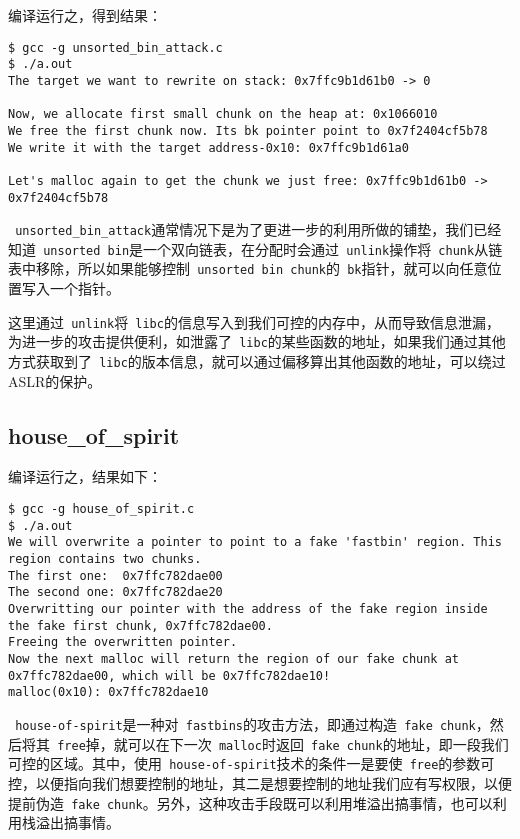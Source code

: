 编译运行之，得到结果：
\begin{verbatim}
$ gcc -g unsorted_bin_attack.c 
$ ./a.out 
The target we want to rewrite on stack: 0x7ffc9b1d61b0 -> 0

Now, we allocate first small chunk on the heap at: 0x1066010
We free the first chunk now. Its bk pointer point to 0x7f2404cf5b78
We write it with the target address-0x10: 0x7ffc9b1d61a0

Let's malloc again to get the chunk we just free: 0x7ffc9b1d61b0 -> 0x7f2404cf5b78
\end{verbatim}

\verb+ unsorted_bin_attack+通常情况下是为了更进一步的利用所做的铺垫，我们已经知道\verb+ unsorted bin+是一个双向链表，在分配时会通过\verb+ unlink+操作将\verb+ chunk+从链表中移除，所以如果能够控制\verb+ unsorted bin chunk+的\verb+ bk+指针，就可以向任意位置写入一个指针。

这里通过\verb+ unlink+将\verb+ libc+的信息写入到我们可控的内存中，从而导致信息泄漏，为进一步的攻击提供便利，如泄露了\verb+ libc+的某些函数的地址，如果我们通过其他方式获取到了\verb+ libc+的版本信息，就可以通过偏移算出其他函数的地址，可以绕过 ASLR的保护。

\subsection{house\_of\_spirit}

编译运行之，结果如下：
\begin{verbatim}
$ gcc -g house_of_spirit.c 
$ ./a.out 
We will overwrite a pointer to point to a fake 'fastbin' region. This region contains two chunks.
The first one:  0x7ffc782dae00
The second one: 0x7ffc782dae20
Overwritting our pointer with the address of the fake region inside the fake first chunk, 0x7ffc782dae00.
Freeing the overwritten pointer.
Now the next malloc will return the region of our fake chunk at 0x7ffc782dae00, which will be 0x7ffc782dae10!
malloc(0x10): 0x7ffc782dae10
\end{verbatim}

\verb+ house-of-spirit+是一种对\verb+ fastbins+的攻击方法，即通过构造\verb+ fake chunk+，然后将其\verb+ free+掉，就可以在下一次\verb+ malloc+时返回\verb+ fake chunk+的地址，即一段我们可控的区域。其中，使用\verb+ house-of-spirit+技术的条件一是要使\verb+ free+的参数可控，以便指向我们想要控制的地址，其二是想要控制的地址我们应有写权限，以便提前伪造\verb+ fake chunk+。另外，这种攻击手段既可以利用堆溢出搞事情，也可以利用栈溢出搞事情。

